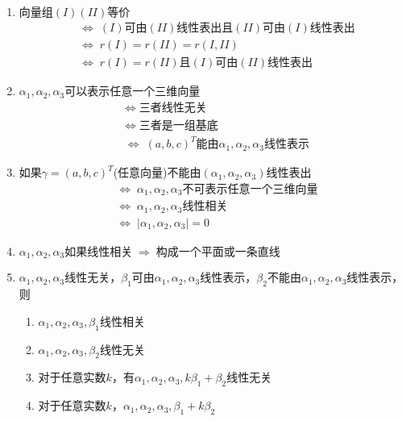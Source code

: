 \documentclass[a4paper,12pt]{article}
\begin{document}
    \begin{enumerate}
        \item $\text{向量组}(I)(II)\text{等价}$
        \begin{align*}
            &\Leftrightarrow\; (I)\text{可由}(II)\text{线性表出}\text{且}(II)\text{可由}(I)\text{线性表出} \\
            &\Leftrightarrow\; r(I) = r(II) = r(I, II) \\
            &\Leftrightarrow\; r(I) = r(II)\text{且}(I)\text{可由}(II)\text{线性表出}
        \end{align*}
        \item $\alpha_1, \alpha_2, \alpha_3$可以表示任意一个三维向量
        \begin{align*}
            &\Leftrightarrow\; \text{三者线性无关}  \\
            &\Leftrightarrow\; \text{三者是一组基底}  \\
            &\Leftrightarrow\; (a, b, c)^T\text{能由}\alpha_1, \alpha_2, \alpha_3\text{线性表示}
        \end{align*}
        \item 如果$\gamma = (a, b, c)^T$(任意向量)不能由$(\alpha_1, \alpha_2, \alpha_3)$线性表出
        \begin{align*}
            &\Leftrightarrow\; \alpha_1, \alpha_2, \alpha_3\text{不可表示任意一个三维向量}  \\
            &\Leftrightarrow\; \alpha_1, \alpha_2, \alpha_3\text{线性相关}  \\
            &\Leftrightarrow\; |\alpha_1, \alpha_2, \alpha_3| = 0
        \end{align*}
        \item $\alpha_1, \alpha_2, \alpha_3\text{如果线性相关} \;\Rightarrow\; \text{构成一个平面或一条直线}$
        \item $\alpha_1, \alpha_2, \alpha_3$线性无关，$\beta_1$可由$\alpha_1, \alpha_2, \alpha_3$线性表示，$\beta_2$不能由$\alpha_1, \alpha_2, \alpha_3$线性表示，则
        \begin{enumerate}
            \item $\alpha_1, \alpha_2, \alpha_3, \beta_1$线性相关
            \item $\alpha_1, \alpha_2, \alpha_3, \beta_2$线性无关
            \item 对于任意实数$k$，有$\alpha_1, \alpha_2, \alpha_3, k\beta_1 + \beta_2$线性无关
            \item 对于任意实数$k$，$\alpha_1, \alpha_2, \alpha_3, \beta_1 + k\beta_2$

\end{enumerate}
\end{enumerate}
\end{document}
